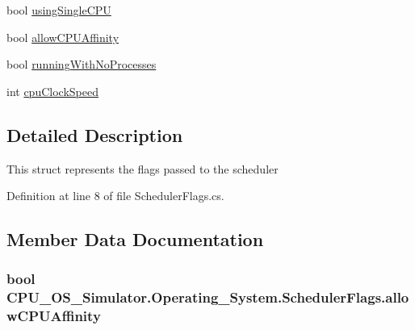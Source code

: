 \begin{DoxyCompactItemize}
\item 
bool \hyperlink{struct_c_p_u___o_s___simulator_1_1_operating___system_1_1_scheduler_flags_a7b42d8ef49035b7d450032a1e4060fb6}{using\+Single\+C\+P\+U}
\item 
bool \hyperlink{struct_c_p_u___o_s___simulator_1_1_operating___system_1_1_scheduler_flags_ad2d1f81a34e9cce1553bfdf8e8a719ea}{allow\+C\+P\+U\+Affinity}
\item 
bool \hyperlink{struct_c_p_u___o_s___simulator_1_1_operating___system_1_1_scheduler_flags_a1a46dce1e8818f1dae579c00eed21ad1}{running\+With\+No\+Processes}
\item 
int \hyperlink{struct_c_p_u___o_s___simulator_1_1_operating___system_1_1_scheduler_flags_a3ce064f3abe5ac1762f0e7bbfab2eee5}{cpu\+Clock\+Speed}
\end{DoxyCompactItemize}


\subsection{Detailed Description}
This struct represents the flags passed to the scheduler 



Definition at line 8 of file Scheduler\+Flags.\+cs.



\subsection{Member Data Documentation}
\hypertarget{struct_c_p_u___o_s___simulator_1_1_operating___system_1_1_scheduler_flags_ad2d1f81a34e9cce1553bfdf8e8a719ea}{}
\subsubsection[{allow\+C\+P\+U\+Affinity}]{\setlength{\rightskip}{0pt plus 5cm}bool C\+P\+U\+\_\+\+O\+S\+\_\+\+Simulator.\+Operating\+\_\+\+System.\+Scheduler\+Flags.\+allow\+C\+P\+U\+Affinity}\label{struct_c_p_u___o_s___simulator_1_1_operating___system_1_1_scheduler_flags_ad2d1f81a34e9cce1553bfdf8e8a719ea}


